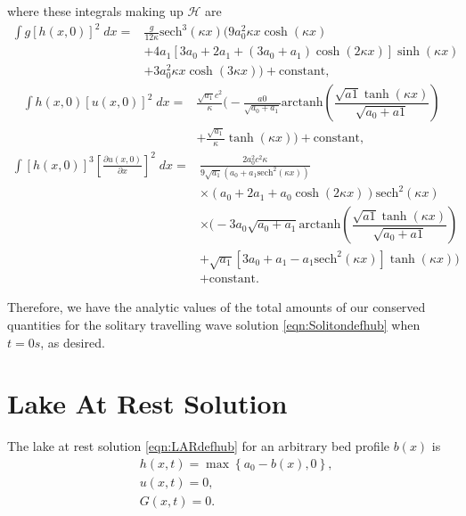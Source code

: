 where these integrals making up $\mathcal{H}$ are
\begin{align*}
\int g\left[h(x,0)\right]^2 \; dx ={}& \frac{g}{12 \kappa }\text{sech}^3\left(\kappa x\right) \Bigg(9a_0^2 \kappa x \cosh\left(\kappa x\right) \\ &+ 4 a_1 \left[3a_0 + 2 a_1 + \left(3a_0 + a_1\right)\cosh\left(2\kappa x\right)\right] \sinh\left(\kappa x\right) \\ & + 3 a_0^2 \kappa x \cosh\left(3\kappa x\right)\Bigg) + \text{constant},
\end{align*}
\begin{align*}
\int h(x,0)\left[u(x,0)\right]^2 \; dx = {}& \frac{\sqrt{a_1}c^2}{\kappa} \Bigg( -\frac{a0}{\sqrt{a_0 + a_1}} \text{arctanh}\left(\dfrac{\sqrt{a1} \tanh\left(\kappa x\right)}{\sqrt{a_0 + a1}}\right)\\ &+ \frac{\sqrt{a_1}}{\kappa}\tanh\left(\kappa x\right)\Bigg)  + \text{constant},
\end{align*} 
\begin{align*}
\int \left[h(x,0)\right]^3 \left[\frac{\partial u(x,0)}{\partial x}\right]^2 \; dx = {}& \frac{2a_0^2c^2 \kappa }{9 \sqrt{a_1} \left(a_0 + a_1\text{sech}^2\left(\kappa x \right) \right)}   \\ &\times\left(a_0 + 2a_1 + a_0 \cosh\left(2\kappa x\right) \right) \text{sech}^2\left(\kappa x\right) \\&\times \Bigg(-3 a_0 \sqrt{a_0 + a_1}\text{arctanh}\left(\dfrac{\sqrt{a1} \tanh\left(\kappa x\right)}{\sqrt{a_0 + a1}}\right)  \\ &+ \sqrt{a_1}\left[3a_0 + a_1 - a_1\text{sech}^2\left(\kappa x\right)\right]\tanh(\kappa x) \Bigg) \\&+ \text{constant}.
\end{align*}
\endgroup

Therefore, we have the analytic values of the total amounts of our conserved quantities for the solitary travelling wave solution \eqref{eqn:Solitondefhub} when $t=0s$, as desired.


\section{Lake At Rest Solution}
The lake at rest solution \eqref{eqn:LARdefhub} for an arbitrary bed profile $b(x)$ is
	\begin{align*}
	&h(x,t) = \max\left\lbrace a_0 - b(x), 0 \right\rbrace, \\
	&u(x,t) = 0 , \\
	&G(x,t) = 0 .
	\end{align*}

